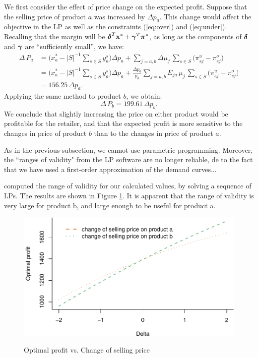 \documentclass[a4paper,11pt]{article}
\begin{document}
We first consider the effect of price change on the expected profit. Suppose that the selling price of product $a$ was increased by $\Delta p_a$. This change would affect the objective in the LP as well as the constraints (\ref{eq:over}) and (\ref{eq:under}). Recalling that the margin will be $\mbox{\boldmath$\delta$}^T \mathbf{x}^* + \mbox{\boldmath$\gamma$}^T \mbox{\boldmath$\pi$}^*$, as long as the components of $\mbox{\boldmath$\delta$}$ and $\mbox{\boldmath$\gamma$}$ are ``sufficiently small”, we have: 
\[
\begin{aligned}
\Delta \, P_a & =
\Big( x_a^* - |S|^{-1} \sum_{s \in S} y_a^s \Big) \Delta p_a +
\sum_{j = a,b} \Delta \mu_j \, \sum_{s \in S}
\big( \pi_{sj}^u - \pi_{sj}^o \big)\\
& = \Big( x_a^* - |S|^{-1} \sum_{s \in S} y_a^s \Big) \Delta p_a +
\frac{\Delta p_a}{p_a} \sum_{j = a,b} E_{ja} \, \mu_j \, \sum_{s \in S} \big( \pi_{sj}^u - \pi_{sj}^o \big)\\
    &= 156.25 \, \Delta p_a.
\end{aligned}
\]
Applying the same method to product $b$, we obtain:
\[
\Delta \, P_b = 199.61 \, \Delta p_b.
\]
We conclude that slightly increasing the price on either product would be profitable for the retailer, and that the expected profit is more sensitive to the changes in price of product $b$ than to the changes in price of product $a$.

As in the previous subsection, we cannot use parametric programming.  Moreover, the ``ranges of validity" from the LP software are no longer reliable, de to the fact that we have used a first-order approximation of the demand curves...

computed the range of validity for our calculated values, by solving a sequence of LPs. The results are shown in Figure \ref{fig:cross}. It is apparent that the range of validity is very large for product b, and large enough to be useful for product a.

\begin{figure}[htb]
\centering
\caption{Optimal profit vs. Change of selling price}
\includegraphics{Example-figure_files/figure-latex/demandunder-1.pdf}
\label{fig:cross}
\end{figure}
\end{document}
